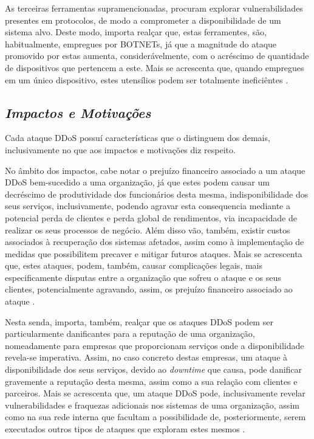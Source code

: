 As terceiras ferramentas supramencionadas, procuram explorar vulnerabilidades presentes em protocolos, de modo a comprometer a disponibilidade de um sistema alvo. Deste modo, importa realçar que, estas ferramentes, são, habitualmente, empregues por BOTNETs, já que a magnitude do ataque promovido por estas aumenta, considerávelmente, com o acréscimo de quantidade de dispositivos que pertencem a este. Mais se acrescenta que, quando empregues em um único dispositivo, estes utensílios podem ser totalmente ineficiêntes \cite{cloudflare_ddos_tools}.

\subsection{\textit{Impactos e Motivações}}
Cada ataque DDoS possuí características que o distinguem dos demais, inclusivamente no que aos impactos e motivações diz respeito.


No âmbito dos impactos, cabe notar o prejuízo financeiro associado a um ataque DDoS bem-sucedido a uma organização, já que estes podem causar um decréscimo de produtividade dos funcionários desta mesma, indisponibilidade dos seus serviços, inclusivamente, podendo agravar esta consequencia mediante a potencial perda de clientes e perda global de rendimentos, via incapacidade de realizar os seus processos de negócio. Além disso vão, também, existir custos associados à recuperação dos sistemas afetados, assim como à implementação de medidas que possibilitem precaver e mitigar futuros ataques. Mais se acrescenta que, estes ataques, podem, também, causar complicações legais, mais especificamente disputas entre a organização que sofreu o ataque e os seus clientes, potencialmente agravando, assim, os prejuízo financeiro associado ao ataque \cite{connectwise_types_of_ddos_attacks,cybergc_defending_agaisnt_ddos,stormwall_impacts_ddos}.

Nesta senda, importa, também, realçar que os ataques DDoS podem ser particularmente danificantes para a reputação de uma organização, nomeadamente para empresas que proporcionam serviços onde a disponibilidade revela-se imperativa. Assim, no caso concreto destas empresas, um ataque à disponibilidade dos seus serviços, devido ao \textit{downtime} que causa, pode danificar gravemente a reputação desta mesma, assim como a sua relação com clientes e parceiros. Mais se acrescenta que, um ataque DDoS pode, inclusivamente revelar vulnerabilidades e fraquezas adicionais nos sistemas de uma organização, assim como na sua rede interna que facultam a possibilidade de, posteriormente, serem executados outros tipos de ataques que exploram estes mesmos \cite{connectwise_types_of_ddos_attacks,cybergc_defending_agaisnt_ddos,stormwall_impacts_ddos}.



